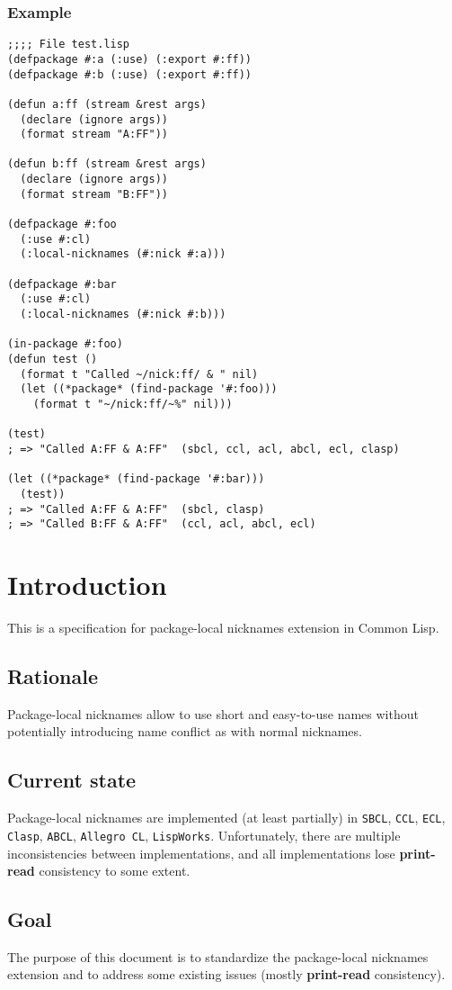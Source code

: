 \documentclass[11pt]{article}
\begin{document}
\subsubsection{Example}
\label{sec:orgf6f5e81}
\begin{verbatim}
;;;; File test.lisp
(defpackage #:a (:use) (:export #:ff))
(defpackage #:b (:use) (:export #:ff))

(defun a:ff (stream &rest args)
  (declare (ignore args))
  (format stream "A:FF"))

(defun b:ff (stream &rest args)
  (declare (ignore args))
  (format stream "B:FF"))

(defpackage #:foo
  (:use #:cl)
  (:local-nicknames (#:nick #:a)))

(defpackage #:bar
  (:use #:cl)
  (:local-nicknames (#:nick #:b)))

(in-package #:foo)
(defun test ()
  (format t "Called ~/nick:ff/ & " nil)
  (let ((*package* (find-package '#:foo)))
    (format t "~/nick:ff/~%" nil)))

(test)
; => "Called A:FF & A:FF"  (sbcl, ccl, acl, abcl, ecl, clasp)

(let ((*package* (find-package '#:bar)))
  (test))
; => "Called A:FF & A:FF"  (sbcl, clasp)
; => "Called B:FF & A:FF"  (ccl, acl, abcl, ecl)
\end{verbatim}
\section{Introduction}
\label{sec:orgd929a2e}
This is a specification for package-local nicknames extension in Common Lisp.
\subsection{Rationale}
\label{sec:org2266ce4}
Package-local nicknames allow to use short and easy-to-use names without
potentially introducing name conflict as with normal nicknames.
\subsection{Current state}
\label{sec:org3ba054c}
Package-local nicknames are implemented (at least partially) in \texttt{SBCL},
\texttt{CCL}, \texttt{ECL}, \texttt{Clasp}, \texttt{ABCL}, \texttt{Allegro CL}, \texttt{LispWorks}. Unfortunately,
there are multiple inconsistencies between implementations, and all
implementations lose \textbf{print-read} consistency to some extent.
\subsection{Goal}
\label{sec:org6e1c355}
The purpose of this document is to standardize the package-local nicknames
extension and to address some existing issues (mostly \textbf{print-read}
consistency).
\end{document}
